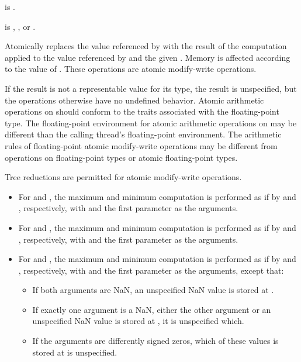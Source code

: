 \begin{itemdescr}
\pnum
\constraints
{} is .

\pnum
\expects
{} is ,
, or
.

\pnum
\effects
Atomically replaces the value referenced by 
with the result of the computation applied to
the value referenced by  and the given .
Memory is affected according to the value of .
These operations are atomic modify-write operations.

\pnum
\remarks
If the result is not a representable value for its type,
the result is unspecified,
but the operations otherwise have no undefined behavior.
Atomic arithmetic operations on 
should conform to the 
traits associated with the floating-point type.
The floating-point environment
for atomic arithmetic operations on 
may be different than the calling thread's floating-point environment.
The arithmetic rules of floating-point atomic modify-write operations
may be different from operations on floating-point types or
atomic floating-point types.
\begin{note}
Tree reductions are permitted for atomic modify-write operations.
\end{note}

\pnum
\begin{itemize}
\item
For  and ,
the maximum and minimum computation is performed
as if by  and , respectively,
with  and the first parameter as the arguments.
\item
For  and ,
the maximum and minimum computation is performed
as if by and , respectively,
with  and the first parameter as the arguments.
\item
For  and ,
the maximum and minimum computation is performed
as if by  and , respectively,
with  and the first parameter as the arguments, except that:
\begin{itemize}
\item
If both arguments are NaN, an unspecified NaN value is stored at .
\item
If exactly one argument is a NaN,
either the other argument or an unspecified NaN value is stored at ,
it is unspecified which.
\item
If the arguments are differently signed zeros,
which of these values is stored at  is unspecified.
\end{itemize}
\end{itemize}


\end{itemdescr}
